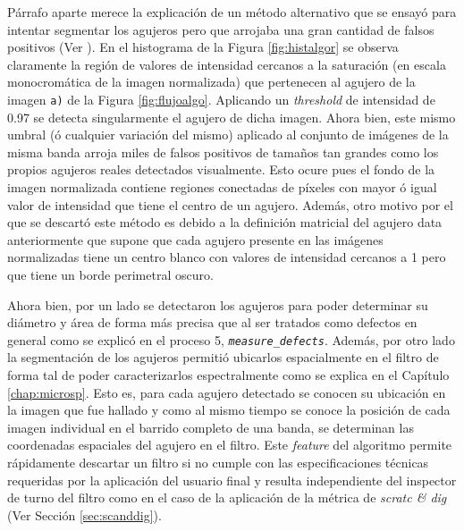 \begin{enumerate}
\hspace{0.5cm}Párrafo aparte merece la explicación de un método alternativo que se ensayó para intentar segmentar los agujeros pero que arrojaba una gran cantidad de falsos positivos (Ver \href{https://github.com/jrr1984/defects_analysis/blob/master/find_contours_holes_trial.py}{\faGithub}). En el histograma de la Figura \ref{fig:histalgor} se observa claramente la región de valores de intensidad cercanos a la saturación (en escala monocromática de la imagen normalizada) que pertenecen al agujero de la imagen \texttt{a)} de la Figura \ref{fig:flujoalgo}. Aplicando un \textit{threshold} de intensidad de 0.97 se detecta singularmente el agujero de dicha imagen. Ahora bien, este mismo umbral (ó cualquier variación del mismo) aplicado al conjunto de imágenes de la misma banda arroja miles de falsos positivos de tamaños tan grandes como los propios agujeros reales detectados visualmente. Esto ocure pues el fondo de la imagen normalizada contiene regiones conectadas de píxeles con mayor ó igual valor de intensidad que tiene el centro de un agujero. Además, otro motivo por el que se descartó este método es debido a la definición matricial del agujero data anteriormente que supone que cada agujero presente en las imágenes normalizadas tiene un centro blanco con valores de intensidad cercanos a 1 pero que tiene un borde perimetral oscuro.

\hspace{0.5cm}Ahora bien, por un lado se detectaron los agujeros para poder determinar su diámetro y área de forma más precisa que al ser tratados como defectos en general como se explicó en el proceso 5, \texttt{\textit{measure\_defects}}. Además, por otro lado la segmentación de los agujeros permitió ubicarlos espacialmente en el filtro de forma tal de poder caracterizarlos espectralmente como se explica en el Capítulo \ref{chap:microsp}. Esto es, para cada agujero detectado se conocen su ubicación en la imagen que fue hallado y como al mismo tiempo se conoce la posición de cada imagen individual en el barrido completo de una banda, se determinan las coordenadas espaciales del agujero en el filtro. Este \textit{feature} del algoritmo permite rápidamente descartar un filtro si no cumple con las especificaciones técnicas requeridas por la aplicación del usuario final y resulta independiente del inspector de turno del filtro como en el caso de la aplicación de la métrica de \textit{scratc \& dig} (Ver Sección \ref{sec:scanddig}).


\end{enumerate}
